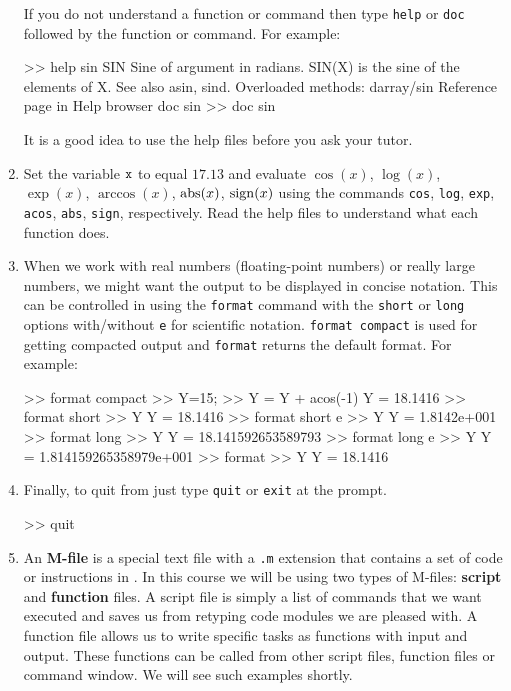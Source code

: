 \begin{labwork}
\begin{enumerate}
{If you do not understand a \Matlab function or command then type {\tt help} or {\tt doc} followed by the function or command. For example:
\begin{VrbM}
>> help sin
 SIN    Sine of argument in radians.
    SIN(X) is the sine of the elements of X.
    See also asin, sind.
    Overloaded methods:
       darray/sin
    Reference page in Help browser
       doc sin
>> doc sin
\end{VrbM}
It is a good idea to use the help files before you ask your tutor. 
}
\item{
Set the variable ${\tt x}$ to equal $17.13$ and evaluate $\cos(x)$, $\log(x)$, $\exp(x)$, $\arccos(x)$, $\operatorname{abs}(x)$, $\operatorname{sign}(x)$ using the \Matlab commands {\tt cos}, {\tt log}, {\tt exp}, {\tt acos}, {\tt abs}, {\tt sign}, respectively.  Read the help files to understand what each function does.
}
\item{
When we work with real numbers (floating-point numbers) or really large numbers, we might want the output to be displayed in concise notation.  This can be controlled in \Matlab using the {\tt format} command with the {\tt short} or {\tt long} options with/without {\tt e} for scientific notation. {\tt format compact} is used for getting compacted output and {\tt format} returns the default format.  For example:
\begin{VrbM}
>> format compact
>> Y=15;
>> Y = Y + acos(-1)
Y =   18.1416
>> format short
>> Y
Y =   18.1416
>> format short e
>> Y
Y =  1.8142e+001
>> format long
>> Y
Y =  18.141592653589793
>> format long e
>> Y
Y =    1.814159265358979e+001
>> format
>> Y
Y =   18.1416
\end{VrbM}
}
\item{
Finally, to quit from \Matlab just type {\tt quit} or {\tt exit} at the prompt.
\begin{VrbM}
>> quit
\end{VrbM}
}
\item{
An {\bf M-file} is a special text file with a {\tt .m} extension that contains a set of code or instructions in \Matlab.  In this course we will be using two types of M-files: {\bf script} and {\bf function} files.  A script file is simply a list of  commands that we want executed and saves us from retyping code modules we are pleased with.  A function file allows us to write specific tasks as functions with input and output.  These functions can be called from other script files, function files or command window.  We will see such examples shortly.
}
\end{enumerate}

\end{labwork}

